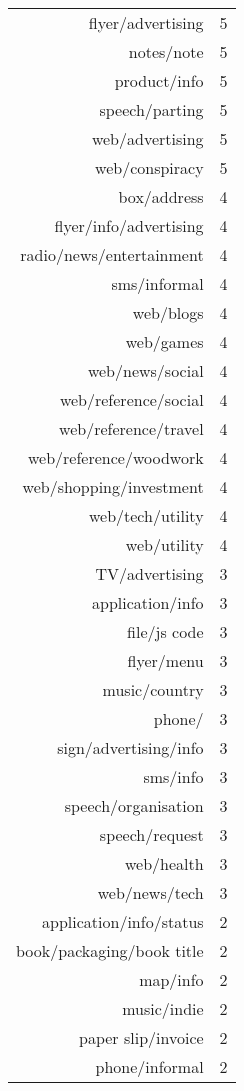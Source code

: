 \begin{longtable}{rr}
      flyer/advertising &   5 \\ 
      notes/note &   5 \\ 
      product/info &   5 \\ 
      speech/parting &   5 \\ 
      web/advertising &   5 \\ 
      web/conspiracy &   5 \\ 
      box/address &   4 \\ 
      flyer/info/advertising &   4 \\ 
      radio/news/entertainment &   4 \\ 
      sms/informal &   4 \\ 
      web/blogs &   4 \\ 
      web/games &   4 \\ 
      web/news/social &   4 \\ 
      web/reference/social &   4 \\ 
      web/reference/travel &   4 \\ 
      web/reference/woodwork &   4 \\ 
      web/shopping/investment &   4 \\ 
      web/tech/utility &   4 \\ 
      web/utility &   4 \\ 
      TV/advertising &   3 \\ 
      application/info &   3 \\ 
      file/js code &   3 \\ 
      flyer/menu &   3 \\ 
      music/country &   3 \\ 
      phone/ &   3 \\ 
      sign/advertising/info &   3 \\ 
      sms/info &   3 \\ 
      speech/organisation &   3 \\ 
      speech/request &   3 \\ 
      web/health &   3 \\ 
      web/news/tech &   3 \\ 
      application/info/status &   2 \\ 
      book/packaging/book title &   2 \\ 
      map/info &   2 \\ 
      music/indie &   2 \\ 
      paper slip/invoice &   2 \\ 
      phone/informal &   2 \\ 

\end{longtable}
